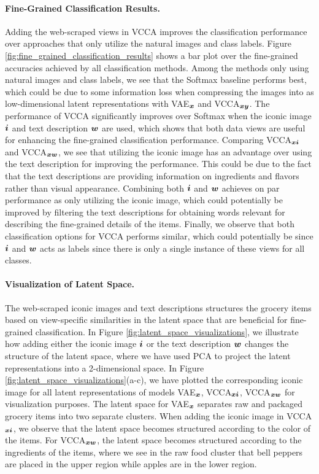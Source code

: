 \paragraph{Fine-Grained Classification Results.} Adding the web-scraped views in VCCA improves the classification performance over approaches that only utilize the natural images and class labels. Figure \ref{fig:fine_grained_classification_results} shows a bar plot over the fine-grained accuracies achieved by all classification methods. Among the methods only using natural images and class labels, we see that the Softmax baseline performs best, which could be due to some information loss when compressing the images into as low-dimensional latent representations with VAE$_{{\bm{x}}}$ and VCCA$_{{\bm{x}} {\bm{y}}}$. The performance of VCCA significantly improves over Softmax when the iconic image ${\bm{i}}$ and text description ${\bm{w}}$ are used, which shows that both data views are useful for enhancing the fine-grained classification performance. Comparing VCCA$_{{\bm{x}} {\bm{i}}}$ and VCCA$_{{\bm{x}} {\bm{w}}}$, we see that utilizing the iconic image has an advantage over using the text description for improving the performance. This could be due to the fact that the text descriptions are providing information on ingredients and flavors rather than visual appearance. Combining both ${\bm{i}}$ and ${\bm{w}}$ achieves on par performance as only utilizing the iconic image, which could potentially be improved by filtering the text descriptions for obtaining words relevant for describing the fine-grained details of the items. Finally, we observe that both classification options for VCCA performs similar, which could potentially be since ${\bm{i}}$ and ${\bm{w}}$ acts as labels since there is only a single instance of these views for all classes.  



 \paragraph{Visualization of Latent Space.} The web-scraped iconic images and text descriptions structures the grocery items based on view-specific similarities in the latent space that are beneficial for fine-grained classification. In Figure \ref{fig:latent_space_visualizations}, we illustrate how adding either the iconic image ${\bm{i}}$ or the text description ${\bm{w}}$ changes the structure of the latent space, where we have used PCA to project the latent representations into a 2-dimensional space. In Figure \ref{fig:latent_space_visualizations}(a-c), we have plotted the corresponding iconic image for all latent representations of models VAE$_{{\bm{x}}}$, VCCA$_{{\bm{x}} {\bm{i}}}$, VCCA$_{{\bm{x}} {\bm{w}}}$ for visualization purposes. The latent space for VAE$_{{\bm{x}}}$ separates raw and packaged grocery items into two separate clusters. When adding the iconic image in VCCA$_{{\bm{x}} {\bm{i}}}$, we observe that the latent space becomes structured according to the color of the items. For VCCA$_{{\bm{x}} {\bm{w}}}$, the latent space becomes structured according to the ingredients of the items, where we see in the raw food cluster that bell peppers are placed in the upper region while apples are in the lower region. 

